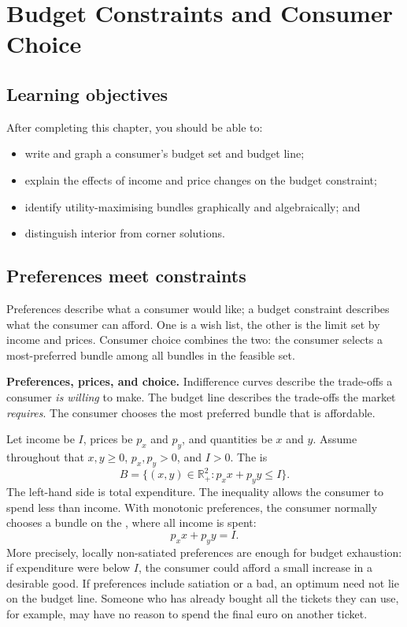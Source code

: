 \chapter{Budget Constraints and Consumer Choice}
\label{chap:consumer-choice}

\section{Learning objectives}

After completing this chapter, you should be able to:
\begin{itemize}
  \item write and graph a consumer's budget set and budget line;
  \item explain the effects of income and price changes on the budget constraint;
  \item identify utility-maximising bundles graphically and algebraically; and
  \item distinguish interior from corner solutions.
\end{itemize}

\section{Preferences meet constraints}

Preferences describe what a consumer would like; a budget constraint describes
what the consumer can afford. One is a wish list, the other is the limit set
by income and prices. Consumer choice combines the two: the consumer selects
a most-preferred bundle among all bundles in the feasible set.

\begin{keyidea}
\textbf{Preferences, prices, and choice.} Indifference curves describe the
trade-offs a consumer \emph{is willing} to make. The budget line describes the
trade-offs the market \emph{requires}. The consumer chooses the most preferred
bundle that is affordable.
\end{keyidea}

Let income be $I$, prices be $p_x$ and $p_y$, and quantities be $x$ and $y$.
Assume throughout that $x,y\geq0$, $p_x,p_y>0$, and $I>0$. The
 is
\[
B=\{(x,y)\in\mathbb{R}_+^2:p_xx+p_yy\leq I\}.
\]
The left-hand side is total expenditure. The inequality allows the consumer
to spend less than income. With monotonic preferences, the consumer normally
chooses a bundle on the , where all income is spent:
\[
p_xx+p_yy=I.
\]
More precisely, locally non-satiated preferences are enough for budget
exhaustion: if expenditure were below $I$, the consumer could afford a small
increase in a desirable good. If preferences include satiation or a bad, an
optimum need not lie on the budget line. Someone who has already bought all
the tickets they can use, for example, may have no reason to spend the final
euro on another ticket.

